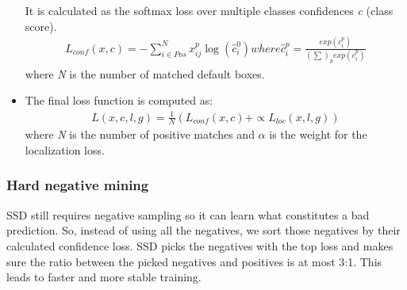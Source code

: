 \begin{itemize}
                    \vspace{3mm}
                    It is calculated as the softmax loss over multiple classes confidences \emph{c} (class score).
                    \begin{align}
                        L_{conf}(x,c) = - \displaystyle\sum_{i \in Pos}^N x_{ij}^p \log(\hat{c}_i^0) where \hat{c}_i^p = \frac{exp(c_i^p)}{(\displaystyle\sum)_p exp(c_i^p)}
                    \end{align}
                    where \emph{N} is the number of matched default boxes.
                \item The final loss function is computed as: 
                    \begin{align}
                        L(x,c,l,g) = \frac{1}{N} (L_{conf}(x,c) + \propto L_{loc}(x,l,g))
                    \end{align}
                    where \emph{N} is the number of positive matches and $\alpha$ is the weight for the localization loss.
            \end{itemize}

        \subsubsection{Hard negative mining}
            SSD still requires negative sampling so it can learn what constitutes a bad prediction. So, instead of using all the negatives, we sort those negatives by their calculated confidence loss. SSD picks the negatives with the top loss and makes sure the ratio between the picked negatives and positives is at most 3:1. This leads to faster and more stable training.

